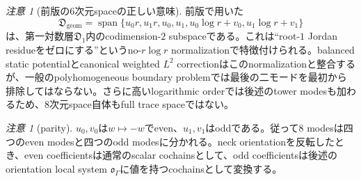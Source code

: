\documentclass[11pt,a4paper]{ltjsarticle}
\theoremstyle{definition}
\theoremstyle{remark}
\newtheorem{remark}[theorem]{注意}
\begin{document}
\begin{remark}[前版の6次元spaceの正しい意味]\label{rem:geometric-six-defect}
前版で用いた
\begin{equation}\label{eq:geometric-six-defect}
 \mathfrak D_{\mathrm{geom}}
 =\operatorname{span}\{u_0r,u_1r,u_0,u_1,
 u_0\log r+v_0,u_1\log r+v_1\}
\end{equation}
は、第一対数層$\mathfrak D_1$内のcodimension-$2$ subspaceである。これは``root-$1$ Jordan residueをゼロにする''というno-$r\log r$ normalizationで特徴付けられる。balanced static potentialとcanonical weighted $L^2$ correctionはこのnormalizationと整合するが、一般のpolyhomogeneous boundary problemでは最後の二モードを最初から排除してはならない。さらに高いlogarithmic orderでは後述のtower modesも加わるため、8次元space自体もfull trace spaceではない。
\end{remark}

\begin{remark}[parity]\label{rem:defect-parity}
$u_0,v_0$は$w\mapsto-w$でeven、$u_1,v_1$はoddである。従って8 modesは四つのeven modesと四つのodd modesに分かれる。neck orientationを反転したとき、even coefficientsは通常のscalar cochainsとして、odd coefficientsは後述のorientation local system $\mathfrak o_\Gamma$に値を持つcochainsとして変換する。
\end{remark}
\end{document}
